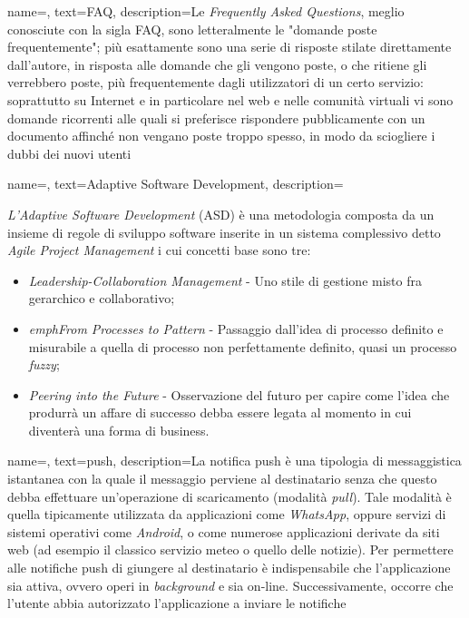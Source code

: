 {
    name=,
    text=FAQ,
    description={Le \emph{Frequently Asked Questions}, meglio conosciute con la sigla FAQ, sono letteralmente le "domande poste frequentemente"; più esattamente sono una serie di risposte stilate direttamente dall'autore, in risposta alle domande che gli vengono poste, o che ritiene gli verrebbero poste, più frequentemente dagli utilizzatori di un certo servizio: soprattutto su Internet e in particolare nel web e nelle comunità virtuali vi sono domande ricorrenti alle quali si preferisce rispondere pubblicamente con un documento affinché non vengano poste troppo spesso, in modo da sciogliere i dubbi dei nuovi utenti}
}

{
    name=,
    text=Adaptive Software Development,
    description={\emph{L’Adaptive Software Development} (ASD) è una
metodologia composta da un insieme di regole di sviluppo software inserite in un
sistema complessivo detto \emph{Agile Project Management} i cui concetti base sono tre:
\begin{itemize}
	\item \emph{Leadership-Collaboration Management} - Uno stile di gestione misto fra gerarchico e collaborativo;
	\item \emph{emphFrom Processes to Pattern} - Passaggio dall’idea di processo definito e
misurabile a quella di processo non perfettamente definito, quasi un processo \emph{fuzzy};
	\item \emph{Peering into the Future} - Osservazione del futuro per capire come l’idea che produrrà un affare di successo debba essere legata al momento in cui diventerà una forma di business.
\end{itemize}}
}

{
    name=,
    text=push,
    description={La notifica push è una tipologia di messaggistica istantanea con la quale il messaggio perviene al destinatario senza che questo debba effettuare un'operazione di scaricamento (modalità \emph{pull}). Tale modalità è quella tipicamente utilizzata da applicazioni come \emph{WhatsApp}, oppure servizi di sistemi operativi come \emph{Android}, o come numerose applicazioni derivate da siti web (ad esempio il classico servizio meteo o quello delle notizie).
Per permettere alle notifiche push di giungere al destinatario è indispensabile che l'applicazione sia attiva, ovvero operi in \emph{background} e sia on-line. Successivamente, occorre che l'utente abbia autorizzato l'applicazione a inviare le notifiche}
}

